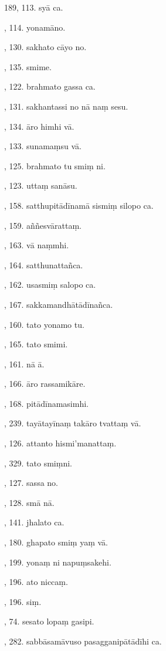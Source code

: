 189, 113. syā ca.\par {}, 114. yonamāno.\par {}, 130. sakhato cāyo no.\par {}, 135. smime.\par {}, 122. brahmato gassa ca.\par {}, 131. sakhantassi no nā naṃ sesu.\par {}, 134. āro himhi vā.\par {}, 133. sunamaṃsu vā.\par {}, 125. brahmato tu smiṃ ni.\par {}, 123. uttaṃ sanāsu.\par {}, 158. satthupitādīnamā sismiṃ silopo ca.\par {}, 159. aññesvārattaṃ.\par {}, 163. vā naṃmhi.\par {}, 164. satthunattañca.\par {}, 162. usasmiṃ salopo ca.\par {}, 167. sakkamandhātādīnañca.\par {}, 160. tato yonamo tu.\par {}, 165. tato smimi.\par {}, 161. nā ā.\par {}, 166. āro rassamikāre.\par {}, 168. pitādīnamasimhi.\par {}, 239. tayātayīnaṃ takāro tvattaṃ vā.\par {}, 126. attanto hismi’manattaṃ.\par {}, 329. tato smiṃni.\par {}, 127. sassa no.\par {}, 128. smā nā.\par {}, 141. jhalato ca.\par {}, 180. ghapato smiṃ yaṃ vā.\par {}, 199. yonaṃ ni napuṃsakehi.\par {}, 196. ato niccaṃ.\par {}, 196. siṃ.\par {}, 74. sesato lopaṃ gasipi.\par {}, 282. sabbāsamāvuso pasagganipātādīhi ca.\par \noindent
